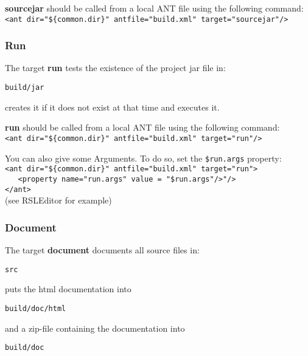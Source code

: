 \documentclass
[
		a4paper,
		twoside, 										
		BCOR10mm,											
		11pt,												
		halfparskip,								
		bigheadings,								
		notitlepage,			
		pdftex											
]
{scrartcl}
\begin{document}
\textbf{sourcejar} should be called from a local ANT file using the following command: 
\footnotesize
\verb|<ant dir="${common.dir}" antfile="build.xml" target="sourcejar"/>|
\normalsize


\subsubsection{Run}
\label{Run}

The target \textbf{run} tests the existence of the project jar file in:
\footnotesize
\begin{compactitem}
	\item \texttt{build/jar}
\end{compactitem}
\normalsize
creates it if it does not exist at that time and executes it.

\textbf{run} should be called from a local ANT file using the following command:\\
\footnotesize
\verb|<ant dir="${common.dir}" antfile="build.xml" target="run"/>|
\normalsize

You can also give some Arguments. To do so, set the \texttt{\$run.args} property:\\
\footnotesize
\verb|<ant dir="${common.dir}" antfile="build.xml" target="run">|\\ \verb|   <property name="run.args" value = "$run.args"/>"/>|\\ \verb|</ant>|
\normalsize
\\(see RSLEditor for example)


\subsubsection{Document}
\label{Document}

The target \textbf{document} documents all source files in:
\footnotesize
\begin{compactitem}
	\item \texttt{src}
\end{compactitem}
\normalsize
puts the html documentation into
\footnotesize
\begin{compactitem}
	\item \texttt{build/doc/html}
\end{compactitem}
\normalsize
and a zip-file containing the documentation into
\footnotesize
\begin{compactitem}
	\item \texttt{build/doc}
\end{compactitem}
\normalsize
\end{document}
